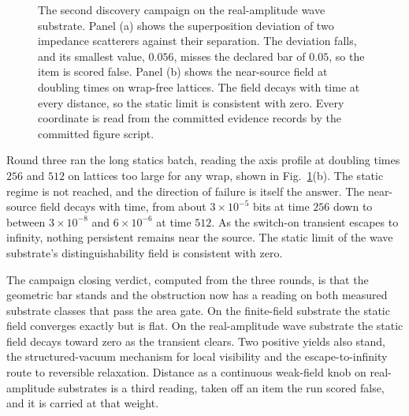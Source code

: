 \documentclass[aps,pre,reprint,nofootinbib]{revtex4-2}
\begin{document}
\begin{figure}[t]
\centering
{}
\caption{The second discovery campaign on the real-amplitude wave
substrate.  Panel (a) shows the superposition deviation of two
impedance scatterers against their separation.  The deviation falls,
and its smallest value, $0.056$, misses the declared bar of $0.05$,
so the item is scored false.  Panel (b) shows the near-source field at doubling times on
wrap-free lattices.  The field decays with time at every distance,
so the static limit is consistent with zero.  Every coordinate is
read from the committed evidence records by the committed figure
script.}
\label{fig:eg4c}
\end{figure}

Round three ran the long statics batch, reading the axis profile at
doubling times $256$ and $512$ on lattices too large for any wrap,
shown in Fig.~\ref{fig:eg4c}(b).  The static regime is not reached,
and the direction of failure is itself the answer.  The near-source
field decays with time, from about $3\times10^{-5}$ bits at time
$256$ down to between $3\times10^{-8}$ and $6\times10^{-6}$ at time $512$.
As the switch-on transient escapes to infinity, nothing persistent
remains near the source.  The static limit of the wave substrate's
distinguishability field is consistent with zero.

The campaign closing verdict, computed from the three rounds, is
that the geometric bar stands and the obstruction now has a reading
on both measured substrate classes that pass the area gate.  On the finite-field
substrate the static field converges exactly but is flat.  On the
real-amplitude wave substrate the static field decays toward zero as
the transient clears.  Two positive yields also stand,
the structured-vacuum mechanism for local visibility and the
escape-to-infinity route to reversible relaxation.  Distance as a
continuous weak-field knob on real-amplitude substrates is a third
reading, taken off an item the run scored false, and it is carried
at that weight.
\end{document}
